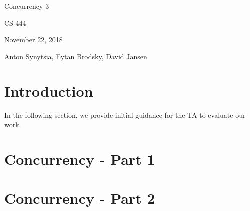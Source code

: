 \documentclass[onecolumn, oneside, letterpaper, draftclsnofoot, 10pt, compsoc]{IEEEtran}
\begin{document}
\begin{titlepage}
\begin{singlespace}
\centering
\scshape{
    \huge{Concurrency 3}\par
    \vspace{.5in}
    \large{CS 444}\par
    \large{November 22, 2018}\par
    \vspace{.5in}
    \large{Anton Synytsia, Eytan Brodsky, David Jansen}\par
    \vspace{.5in}
    \vfill
}
\end{singlespace}
\end{titlepage}
\newpage
{}
\tableofcontents
\clearpage

\section{Introduction}
In the following section, we provide initial guidance for the TA to evaluate our work.

\section{Concurrency - Part 1}

\section{Concurrency - Part 2}


%
%
\end{document}
